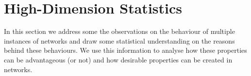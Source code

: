 \section{High-Dimension Statistics}
\label{sec:highds}
In this section we address some the observations on the behaviour of multiple instances of networks and draw some statistical understanding on the reasons behind these behaviours. We use this information to analyse how these properties can be advantageous (or not) and how desirable properties can be created in networks.



